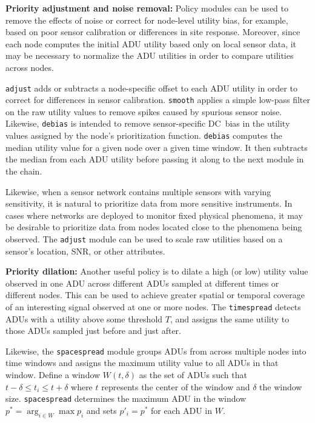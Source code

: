 {\bf Priority adjustment and noise removal:} 
Policy modules can be used to remove the effects of noise or correct 
for node-level utility bias, for example, based on poor sensor 
calibration or differences in site response. Moreover, since each node 
computes the initial ADU utility based only on local sensor data, it may be 
necessary to normalize the ADU utilities in order to compare 
utilities across nodes. 

{\tt adjust} adds or subtracts a node-specific offset to each ADU utility
in order to correct for differences in sensor calibration. {\tt smooth}
applies a simple low-pass filter on the raw utility values to remove
spikes caused by spurious sensor noise.
Likewise, {\tt debias} is intended to remove
sensor-specific DC~bias in the utility values assigned by the node's
prioritization function. {\tt debias} computes the median utility
value for a given node over a given time window. It then subtracts
the median from each ADU utility before passing it along to the next
module in the chain. 

Likewise, when a sensor network contains
multiple sensors with varying sensitivity, it is natural to
prioritize data from more sensitive instruments. In cases where networks are
deployed to monitor fixed physical phenomena, it may be desirable to
prioritize data from nodes located close to the phenomena being
observed. The {\tt adjust} module can be used to scale
raw utilities based on a sensor's location, SNR, or other attributes.

{\bf Priority dilation:} 
Another useful policy is to dilate a high (or
low) utility value observed in one ADU across different ADUs sampled
at different times or different nodes. This can be used to achieve
greater spatial or temporal coverage of an interesting signal
observed at one or more nodes. The {\tt timespread} detects ADUs with
a utility above some threshold $T$, and 
assigns the same utility to those ADUs sampled just before and just
after.

Likewise, the {\tt spacespread} module groups ADUs from across multiple
nodes into time windows and assigns the maximum utility value to all
ADUs in that window.  Define a window $W(t,\delta)$ as the set of ADUs
such that $t-\delta \leq t_i \leq t+\delta$ where $t$ represents the
center of the window and $\delta$ the window size. {\tt spacespread}
determines the maximum ADU in the window $p^* = \arg_{i \in W} \max p_i$
and sets $p'_i = p^{*}$ for each ADU in $W$. 

